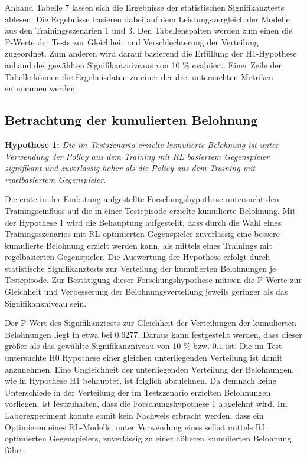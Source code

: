 Anhand Tabelle 7 lassen sich die Ergebnisse der statistischen Signifikanztests ablesen.
Die Ergebnisse basieren dabei auf dem Leistungsvergleich der Modelle aus den Trainingsszenarien 1 und 3.
Den Tabellenspalten werden zum einen die P-Werte der Tests zur Gleichheit und Verschlechterung der Verteilung zugeordnet.
Zum anderen wird darauf basierend die Erfüllung der H1-Hypothese anhand des gewählten Signifikanzniveaus von 10 \% evaluiert.
Einer Zeile der Tabelle können die Ergebnisdaten zu einer der drei untersuchten Metriken entnommen werden. %

\subsection{Betrachtung der kumulierten Belohnung}

\textbf{Hypothese 1:}
\textit{Die im Testszenario erzielte kumulierte Belohnung ist unter Verwendung der Policy aus dem Training mit RL basiertem Gegenspieler signifikant und zuverlässig höher als die Policy aus dem Training mit regelbasiertem Gegenspieler.}

Die erste in der Einleitung aufgestellte Forschungshypothese untersucht den Trainingseinfluss auf die in einer Testepisode erzielte kumulierte Belohnung.
Mit der Hypothese 1 wird die Behauptung aufgestellt, dass durch die Wahl eines Trainingsszenarios mit RL-optimierten Gegenspieler zuverlässig eine bessere kumulierte Belohnung erzielt werden kann, als mittels eines Trainings mit regelbasierten Gegenspieler.
Die Auswertung der Hypothese erfolgt durch statistische Signifikanztests zur Verteilung der kumulierten Belohnungen je Testepisode.
Zur Bestätigung dieser Forschungshypothese müssen die P-Werte zur Gleichheit und Verbesserung der Belohnungsverteilung jeweils geringer als das Signifikanzniveau sein. 

Der P-Wert des Signifikanztests zur Gleichheit der Verteilungen der kumulierten Belohnungen liegt in etwa bei $0.6277$.
Daraus kann festgestellt werden, dass dieser größer als das gewählte Signifikanzniveau von 10 \% bzw. $0.1$ ist.
Die im Test untersuchte H0 Hypothese einer gleichen unterliegenden Verteilung ist damit anzunehmen.
Eine Ungleichheit der unterliegenden Verteilung der Belohnungen, wie in Hypothese H1 behauptet, ist folglich abzulehnen.
Da demnach keine Unterschiede in der Verteilung der im Testszenario erzielten Belohnungen vorliegen, ist festzuhalten, dass die Forschungshypothese 1 abgelehnt wird.
Im Laborexperiment konnte somit kein Nachweis erbracht werden, dass ein Optimieren eines RL-Modells, unter Verwendung eines selbst mittels RL optimierten Gegenspielers, zuverlässig zu einer höheren kumulierten Belohnung führt.

